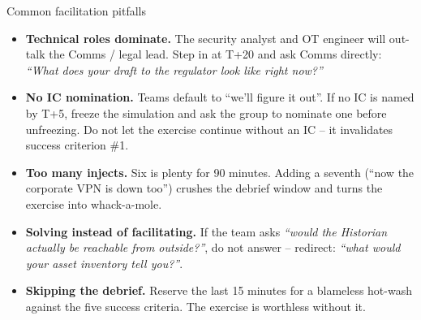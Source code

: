 \documentclass[11pt,a4paper]{article}
\begin{document}
\begin{solutionbox}{Common facilitation pitfalls}
\begin{itemize}[leftmargin=*, nosep]
  \item \textbf{Technical roles dominate.} The security analyst and
        OT engineer will out-talk the Comms / legal lead. Step in at
        T+20 and ask Comms directly: \emph{``What does your draft to
        the regulator look like right now?''}
  \item \textbf{No IC nomination.} Teams default to ``we'll figure it
        out''. If no IC is named by T+5, freeze the simulation and
        ask the group to nominate one before unfreezing. Do not let
        the exercise continue without an IC -- it invalidates success
        criterion \#1.
  \item \textbf{Too many injects.} Six is plenty for 90 minutes.
        Adding a seventh (``now the corporate VPN is down too'')
        crushes the debrief window and turns the exercise into
        whack-a-mole.
  \item \textbf{Solving instead of facilitating.} If the team asks
        \emph{``would the Historian actually be reachable from
        outside?''}, do not answer -- redirect: \emph{``what would
        your asset inventory tell you?''}.
  \item \textbf{Skipping the debrief.} Reserve the last 15 minutes
        for a blameless hot-wash against the five success criteria.
        The exercise is worthless without it.
\end{itemize}
\end{solutionbox}
\end{document}
